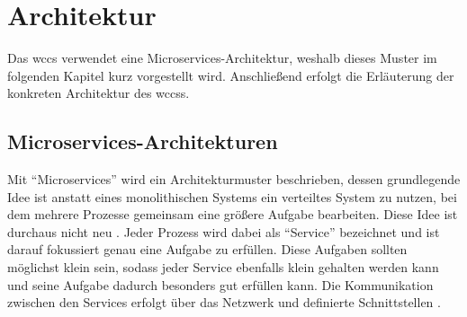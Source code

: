 \section{Architektur}
    \label{section:Architecture}
    Das \gls{wccs} verwendet eine Microservices-Architektur,
    weshalb dieses Muster im folgenden Kapitel kurz vorgestellt wird.
    Anschließend erfolgt die Erläuterung der konkreten Architektur des \glspl{wccs}.

    \subsection{Microservices-Architekturen}
        \label{section:conceptMicroServices}
        Mit "`Microservices"' wird ein Architekturmuster beschrieben,
        dessen grundlegende Idee ist anstatt eines monolithischen Systems
        ein verteiltes System zu nutzen, bei dem mehrere Prozesse gemeinsam
        eine größere Aufgabe bearbeiten.
        Diese Idee ist durchaus nicht neu
        \cite{tanenbaum:distributedSystems}.
        Jeder Prozess wird dabei als "`Service"' bezeichnet und ist darauf
        fokussiert genau eine Aufgabe zu erfüllen.
        Diese Aufgaben sollten möglichst klein sein,
        sodass jeder Service ebenfalls klein gehalten werden kann und seine
        Aufgabe dadurch besonders gut erfüllen kann.
        Die Kommunikation zwischen den Services erfolgt über das Netzwerk
        und definierte Schnittstellen
        \cite[Kapitel 1.1]{newman:microservices}.


